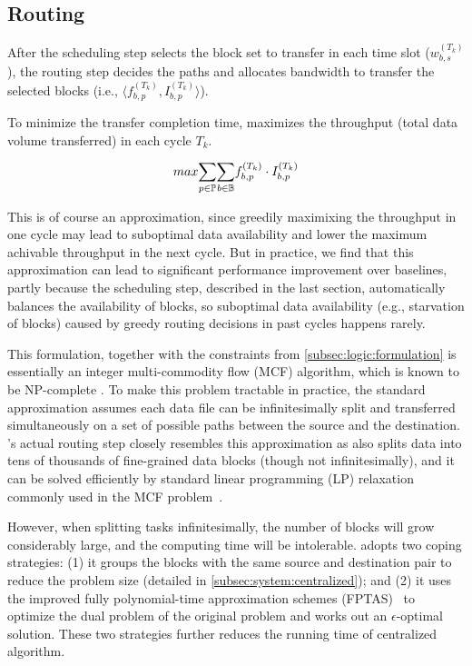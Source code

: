 \subsection{Routing}
\label{subsec:logic:routing}

After the scheduling step selects the block set to transfer in each
time slot ($w^{(T_k)}_{b,s}$), the routing step decides the paths and
allocates bandwidth to transfer the selected blocks (i.e.,
$\langle f_{b,p}^{(T_k)}, I_{b,p}^{(T_k)}\rangle$).

To minimize the transfer completion time, \name maximizes the
throughput (total data volume transferred) in each cycle $T_k$.

\begin{equation}
\centering
max \displaystyle{\sum_{p\in \mathbb{P}}}
\displaystyle{\sum_{b\in \mathbb{B}}}
f_{b,p}^{(T_k)} \cdot I_{b,p}^{(T_k)}
\end{equation}

This is of course an approximation, since greedily maximixing the
throughput in one cycle may lead to suboptimal data availability and
lower the maximum achivable throughput in the next cycle. But in
practice, we find that this approximation can lead to significant
performance improvement over baselines, partly because the scheduling
step, described in the last section, automatically balances the
availability of blocks, so suboptimal data availability (e.g.,
starvation of blocks) caused by greedy routing decisions in past
cycles happens rarely.

This formulation, together with the constraints from
\Section\ref{subsec:logic:formulation} is essentially an integer
multi-commodity flow (MCF) algorithm, which is known to be
NP-complete \cite{garg1997primal}. To make this problem tractable in
practice, the standard approximation assumes each data file can be
infinitesimally split and transferred simultaneously on a set of
possible paths between the source and the destination. \name's actual
routing step closely resembles this approximation as \name also
splits data into tens of thousands of fine-grained data blocks
(though not infinitesimally), and it can be solved efficiently by
standard linear programming (LP) relaxation commonly used in the MCF
problem~\cite{garg2007faster,reed2012traffic}.

However, when splitting tasks infinitesimally, the number of blocks
will grow considerably large, and the computing time will be
intolerable. \name adopts two coping strategies: (1) it groups the
blocks with the same source and destination pair to reduce the
problem size (detailed in \Section\ref{subsec:system:centralized});
and (2) it uses the improved fully polynomial-time approximation
schemes (FPTAS)~\cite{fleischer2000approximating} to optimize the
dual problem of the original problem and works out an
$\epsilon$-optimal solution. These two strategies further reduces the
running time of centralized algorithm.





